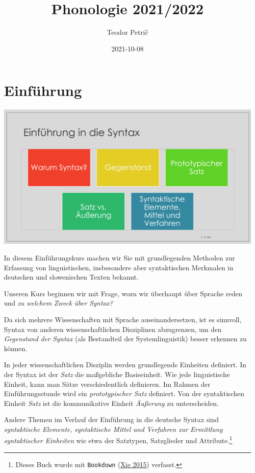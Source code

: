 \documentclass[
]{article}
\title{Phonologie 2021/2022}
\author{Teodor Petrič}
\date{2021-10-08}
\begin{document}
\maketitle

{
\hypersetup{linkcolor=}
\setcounter{tocdepth}{2}
\tableofcontents
}
\hypertarget{einfuxfchrung}{%
\section{Einführung}\label{einfuxfchrung}}

\includegraphics[width=1\linewidth]{pictures/Syntax_intro_01}

In diesem Einführungskurs machen wir Sie mit grundlegenden Methoden zur
Erfassung von linguistischen, insbesondere aber syntaktischen Merkmalen
in deutschen und slowenischen Texten bekannt.

Unseren Kurs beginnen wir mit Frage, wozu wir überhaupt über Sprache
reden und \emph{zu welchem Zweck über Syntax?}

Da sich mehrere Wissenschaften mit Sprache auseinandersetzen, ist es
sinnvoll, Syntax von anderen wissenschaftlichen Disziplinen abzugrenzen,
um den \emph{Gegenstand der Syntax} (als Bestandteil der Systemlinguistik)
besser erkennen zu können.

In jeder wissenschaftlichen Disziplin werden grundlegende Einheiten
definiert. In der Syntax ist der \emph{Satz} die maßgebliche Basiseinheit.
Wie jede linguistische Einheit, kann man Sätze verschiedentlich
definieren. Im Rahmen der Einführungsstunde wird ein \emph{prototypischer
Satz} definiert. Von der syntaktischen Einheit \emph{Satz} ist die
kommunikative Einheit \emph{Äußerung} zu unterscheiden.

Andere Themen im Verlauf der Einführung in die deutsche Syntax sind
\emph{syntaktische Elemente, syntaktische Mittel und Verfahren zur Ermittlung
syntaktischer Einheiten} wie etwa der Satztypen, Satzglieder und
Attribute.\footnote{Dieses Buch wurde mit \texttt{Bookdown} (\protect\hyperlink{ref-xie2015}{Xie 2015}) verfasst.}
\end{document}
